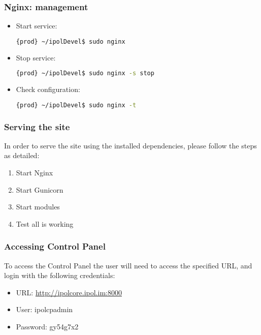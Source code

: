 \subsubsection{Nginx: management}
\begin{itemize}
\item Start service:
\begin{lstlisting}[language=Bash]
{prod} ~/ipolDevel$ sudo nginx
\end{lstlisting}
\item Stop service:
\begin{lstlisting}[language=Bash]
{prod} ~/ipolDevel$ sudo nginx -s stop
\end{lstlisting}
\item Check configuration:
\begin{lstlisting}[language=Bash]
{prod} ~/ipolDevel$ sudo nginx -t
\end{lstlisting}
\end{itemize}

\subsubsection{Serving the site}
In order to serve the site using the installed dependencies, please follow the steps as detailed:
\begin{enumerate}
\item Start Nginx
\item Start Gunicorn
\item Start modules
\item Test all is working
\end{enumerate}

\subsubsection{Accessing Control Panel}
To access the Control Panel the user will need to access the specified URL, and login with the following credentials:

\begin{itemize}
\item URL: \url{http://ipolcore.ipol.im:8000}

\item User: ipolcpadmin

\item Password: gy54g7x2 
\end{itemize}

